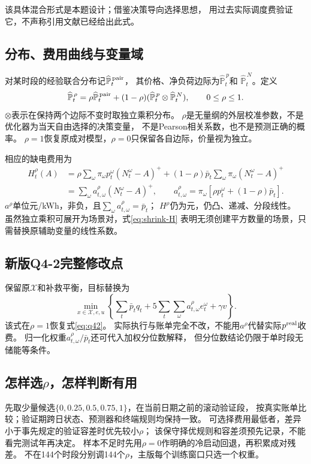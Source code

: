\documentclass[UTF8,11pt]{ctexart}
\begin{document}
该具体混合形式是本题设计；借鉴决策导向选择思想\cite{elmachtoub2022}，
用过去实际调度费验证它，不声称引用文献已经给出此式。

\subsection{分布、费用曲线与变量域}
对某时段的经验联合分布记$\widehat{\mathbb P}^{\,\rm pair}_t$，
其价格、净负荷边际为$\widehat{\mathbb P}^{\,p}_t$和
$\widehat{\mathbb P}^{\,N}_t$。定义
\begin{equation}
 \widehat{\mathbb P}^{\,\rho}_t
  =\rho\widehat{\mathbb P}^{\,\rm pair}_t+
   (1-\rho)(\widehat{\mathbb P}^{\,p}_t\otimes\widehat{\mathbb P}^{\,N}_t),
 \qquad 0\leq\rho\leq1.
\end{equation}
$\otimes$表示在保持两个边际不变时取独立乘积分布。
$\rho$是无量纲的外层校准参数，不是优化器为当天自由选择的决策变量，
不是Pearson相关系数，也不是预测正确的概率。
$\rho=1$恢复原成对模型，$\rho=0$只保留各自边际，价量视为独立。

相应的缺电费用为
\begin{align}
 H_t^\rho(A)
 &=\rho\sum_\omega\pi_\omega p_t^\omega(N_t^\omega-A)^+
 +(1-\rho)\bar p_t\sum_\omega\pi_\omega(N_t^\omega-A)^+\\
 &=\sum_\omega a^\rho_{t,\omega}(N_t^\omega-A)^+,\qquad
 a^\rho_{t,\omega}=\pi_\omega[\rho p_t^\omega+(1-\rho)\bar p_t].
 \label{eq:shrink-H}
\end{align}
$a^\rho$单位元/kWh，非负，且$\sum_\omega a^\rho_{t,\omega}=\bar p_t$；
$H^\rho$仍为元，仍凸、递减、分段线性。
虽然独立乘积可展开为场景对，式\eqref{eq:shrink-H}
表明无须创建平方数量的场景，只需替换原辅助变量的线性系数。

\subsection{新版Q4-2完整修改点}
保留原$\mathcal X$和补救平衡，目标替换为
\begin{equation}\label{eq:q42-new}
 \min_{x\in\mathcal X,e,u}
 \left\{\sum_t\bar p_tq_t+
      5\sum_t\sum_\omega a^\rho_{t,\omega}e_t^\omega+\gamma v\right\}.
\end{equation}
该式在$\rho=1$恢复式\eqref{eq:q42}。
实际执行与账单完全不改，不能用$a^\rho$代替实际$p^{\rm real}$收费。
归一化权重$a^\rho_{t,\omega}/\bar p_t$还可代入加权分位数解释，
但分位数结论仍限于单时段无储能等条件。

\subsection{怎样选\texorpdfstring{$\rho$}{rho}，怎样判断有用}
先取少量候选$\{0,0.25,0.5,0.75,1\}$，在当前日期之前的滚动验证段，
按真实账单比较；验证期跨日状态、预测器和终端规则均保持一致。
可选择费用最低者，差异小于事先规定的验证容差时优先较小$\rho$；
该保守择优规则和容差须预先记录，不能看完测试年再决定。
样本不足时先用$\rho=0$作明确的冷启动回退，再积累成对残差。
不在144个时段分别调144个$\rho$，主版每个训练窗口只选一个权重。
\end{document}
